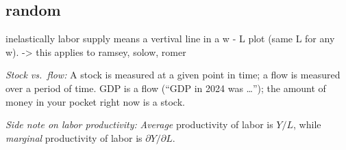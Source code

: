 \subsection{random}

inelastically labor supply means a vertival line in a w - L plot (same L for any w). -> this applies to ramsey, solow, romer


    \item \textit{Stock vs.\ flow:} A stock is measured at a given point in time; a flow is measured over a period of time. GDP is a flow (``GDP in 2024 was \dots''); the amount of money in your pocket right now is a stock.
    \item \textit{Side note on labor productivity:} \textit{Average} productivity of labor is $Y/L$, while \textit{marginal} productivity of labor is $\partial Y/\partial L$.